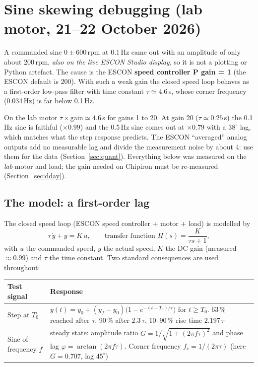 \documentclass[a4paper,11pt]{article}
\begin{document}
\section{Sine skewing debugging (lab motor, 21--22 October 2026)}\label{sec:skew}

\begin{okbox}[Summary]
A commanded sine $0\pm600$\,rpm at 0.1\,Hz came out with an amplitude of only about 200\,rpm, \emph{also on the live ESCON Studio display}, so it is not a plotting or Python artefact. The cause is the ESCON \textbf{speed controller P gain = 1} (the ESCON default is 200). With such a weak gain the closed speed loop behaves as a first-order low-pass filter with time constant $\tau\simeq4.6$\,s, whose corner frequency (0.034\,Hz) is far below 0.1\,Hz.

On the lab motor $\tau\times\text{gain}\simeq4.6$\,s for gains 1 to 20. At gain 20 ($\tau\simeq0.25$\,s) the 0.1\,Hz sine is faithful ($\times0.99$) and the 0.5\,Hz sine comes out at $\times0.79$ with a $38^\circ$ lag, which matches  what the step response predicts. The ESCON ``averaged'' analog outputs add no measurable lag and divide the measurement noise by about 4: use them for the data (Section~\ref{sec:quant}). Everything below was measured on the \emph{lab} motor and load; the gain needed on Chipiron must be re-measured (Section~\ref{sec:dday}).
\end{okbox}

\subsection{The model: a first-order lag}\label{sec:fo-model}
The closed speed loop (ESCON speed controller + motor + load) is modelled by
\[
  \tau\,\dot y + y = K\,u ,\qquad \text{transfer function } H(s)=\frac{K}{\tau s+1},
\]
with $u$ the commanded speed, $y$ the actual speed, $K$ the DC gain (measured $\approx0.99$) and $\tau$ the time constant. Two standard consequences are used throughout:

\begin{center}
\begin{tabular}{@{}L{3.2cm}L{11.8cm}@{}}
\toprule
\textbf{Test signal} & \textbf{Response} \\
\midrule
Step at $T_0$ & $y(t)=y_0+(y_f-y_0)\bigl(1-e^{-(t-T_0)/\tau}\bigr)$ for $t\ge T_0$. 63\,\% reached after $\tau$, 90\,\% after $2.3\,\tau$, 10--90\,\% rise time $2.197\,\tau$ \\
\addlinespace
Sine of frequency $f$ & steady state: amplitude ratio $G=1/\sqrt{1+(2\pi f\tau)^2}$ and phase lag $\varphi=\arctan(2\pi f\tau)$. Corner frequency $f_c=1/(2\pi\tau)$ (here $G=0.707$, lag $45^\circ$) \\
\bottomrule
\end{tabular}
\end{center}
\end{document}
